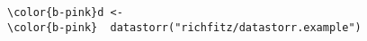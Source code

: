 \documentclass[class=minimal,border=0]{standalone}
\begin{document}
%
\begin{BVerbatim}[bgcolor=b-darkgrey]
\color{b-pink}d <-
\color{b-pink}  datastorr("richfitz/datastorr.example")
\end{BVerbatim}
\end{document}

